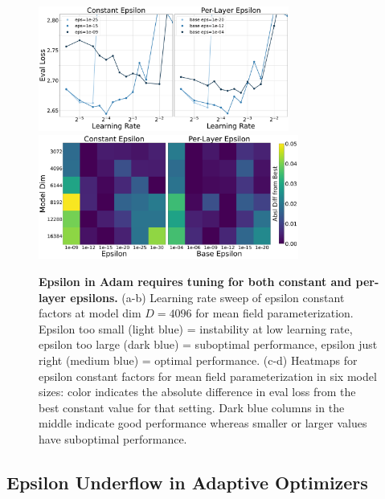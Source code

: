\documentclass{article}
\theoremstyle{plain}
\theoremstyle{definition}
\theoremstyle{remark}
\begin{document}
\begin{figure}[ht]
    \centering
    \includegraphics[height=4.1cm]{icml2024/figures/epsilon/epsilon_constant_sweeps.pdf}
    \includegraphics[height=4.1cm]{icml2024/figures/epsilon/epsilon_heatmaps_bothlabels.pdf}
    \caption{\textbf{Epsilon in Adam requires tuning for both constant and per-layer epsilons.} (a-b) Learning rate sweep of epsilon constant factors at model dim $D=4096$ for mean field parameterization. Epsilon too small (light blue) = instability at low learning rate, epsilon too large (dark blue) = suboptimal performance, epsilon just right (medium blue) = optimal performance. (c-d) Heatmaps for epsilon constant factors for mean field parameterization in six model sizes: color indicates the absolute difference in eval loss from the best constant value for that setting. Dark blue columns in the middle indicate good performance whereas smaller or larger values have suboptimal performance.}
    \label{fig:epsilon_constants}
\end{figure}


















\subsection{Epsilon Underflow in Adaptive Optimizers}
\label{sec:results_epsilon}
\end{document}

